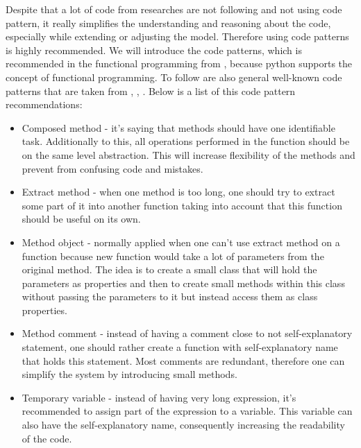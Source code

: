 Despite that a lot of code from researches are not following and not using code
pattern, it really simplifies the understanding and reasoning about the code, especially
while extending or adjusting the model. Therefore using code patterns
is highly recommended. We will introduce the code patterns, which
is recommended in the functional programming from \cite{beck1997smalltalk},
because python supports the concept of functional programming.
To follow are also general well-known code patterns that are taken from
\cite{martin2003agile}, \cite{Eckel2017}, \cite{Gamma:1995:DPE:186897}.
Below is a list of this code pattern recommendations:

\begin{itemize}
	\item Composed method - it's saying that methods should
		have one identifiable task. Additionally to this, all operations
		performed in the function should be on the same level abstraction.
		This will increase flexibility of the methods and prevent
		from confusing code and mistakes. \cite{beck1997smalltalk}
	\item Extract method - when one method is too long, one should try to
		extract some part of it into another function taking into account that this
		function should be useful on its own. \cite{1999:RID:311424}
	\item Method object -  normally applied when one can't use extract method
	 	on a function because new function would take a lot of parameters
		from the original method.
		The idea is to create a small class that will hold the parameters
		as properties and then to create small methods within this class without
		passing the parameters to it but instead access them as class properties.
		\cite{beck1997smalltalk}
	\item Method comment - instead of having a comment close to not
		self-explanatory statement, one should rather create a function
		with self-explanatory name that holds this statement.
		Most comments are redundant, therefore one can simplify
		the system by introducing small methods.
		\cite{beck1997smalltalk}
	\item Temporary variable - instead of having very long expression, it's recommended
		to assign part of the expression to a variable. This variable can also have
		the self-explanatory name, consequently increasing the readability of the code.\cite{beck1997smalltalk}


\end{itemize}
